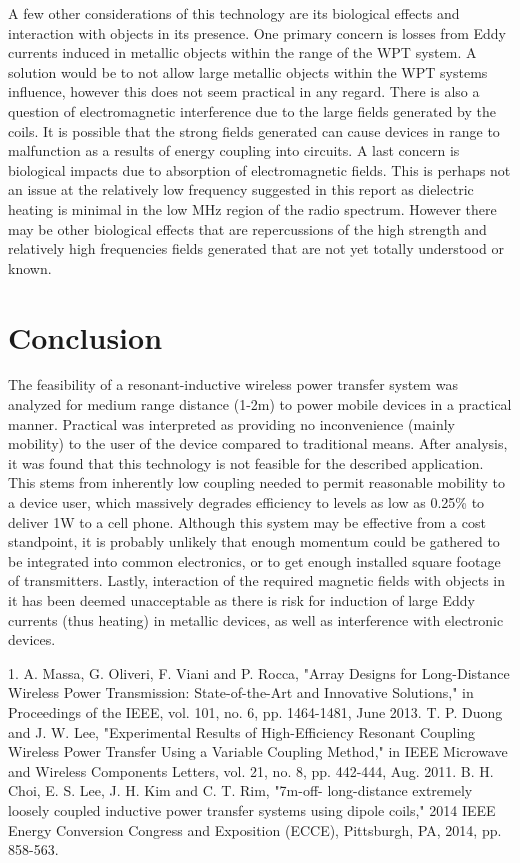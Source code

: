 \documentclass[11pt,letterpaper]{article}
\begin{document}
\noindent A few other considerations of this technology are its biological effects and interaction with objects in its presence. One primary concern is losses from Eddy currents induced in metallic objects within the range of the WPT system. A solution would be to not allow large metallic objects within the WPT systems influence, however this does not seem practical in any regard. There is also a question of electromagnetic interference due to the large fields generated by the coils. It is possible that the strong fields generated can cause devices in range to malfunction as a results of energy coupling into circuits. A last concern is biological impacts due to absorption of electromagnetic fields. This is perhaps not an issue at the relatively low frequency suggested in this report as dielectric heating is minimal in the low MHz region of the radio spectrum. However there may be other biological effects that are repercussions of the high strength and relatively high frequencies fields generated that are not yet totally understood or known. 

\section*{Conclusion}
The feasibility of a resonant-inductive wireless power transfer system was analyzed for medium range distance (1-2m) to power mobile devices in a practical manner. Practical was interpreted as providing no inconvenience (mainly mobility) to the user of the device compared to traditional means. After analysis, it was found that this technology is not feasible for the described application. This stems from inherently low coupling needed to permit reasonable mobility to a device user, which massively degrades efficiency to levels as low as 0.25\% to deliver 1W to a cell phone. Although this system may be effective from a cost standpoint, it is probably unlikely that enough momentum could be gathered to be integrated into common electronics, or to get enough installed square footage of transmitters. Lastly, interaction of the required magnetic fields with objects in it has been deemed unacceptable as there is risk for induction of large Eddy currents (thus heating) in metallic devices, as well as interference with electronic devices.
\begin{thebibliography}{1}
	
	1. A. Massa, G. Oliveri, F. Viani and P. Rocca, "Array Designs for Long-Distance Wireless Power Transmission: State-of-the-Art and Innovative Solutions," in Proceedings of the IEEE, vol. 101, no. 6, pp. 1464-1481, June 2013.
	T. P. Duong and J. W. Lee, "Experimental Results of High-Efficiency Resonant Coupling Wireless Power Transfer Using a Variable Coupling Method," in IEEE Microwave and Wireless Components Letters, vol. 21, no. 8, pp. 442-444, Aug. 2011.
	B. H. Choi, E. S. Lee, J. H. Kim and C. T. Rim, "7m-off- long-distance extremely loosely coupled inductive power transfer systems using dipole coils," 2014 IEEE Energy Conversion Congress and Exposition (ECCE), Pittsburgh, PA, 2014, pp. 858-563.

\end{thebibliography}
\end{document}
